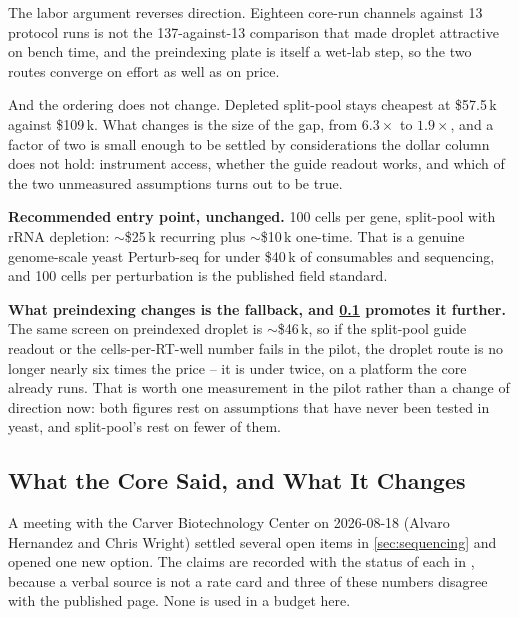 The labor argument reverses direction. Eighteen core-run channels against 13
protocol runs is not the 137-against-13 comparison that made droplet attractive
on bench time, and the preindexing plate is itself a wet-lab step, so the two
routes converge on effort as well as on price.

And the ordering does not change. Depleted split-pool stays cheapest at \$57.5\,k
against \$109\,k. What changes is the size of the gap, from $6.3\times$ to
$1.9\times$, and a factor of two is small enough to be settled by considerations
the dollar column does not hold: instrument access, whether the guide readout
works, and which of the two unmeasured assumptions turns out to be true.

\begin{keybox}
\textbf{Recommended entry point, unchanged.} 100 cells per gene, split-pool with
rRNA depletion: $\sim$\$25\,k recurring plus $\sim$\$10\,k one-time. That is a
genuine genome-scale yeast Perturb-seq for under \$40\,k of consumables and
sequencing, and 100 cells per perturbation is the published field standard.

\textbf{What preindexing changes is the fallback, and \cref{sec:core-meeting} promotes it further.} The same screen
on preindexed droplet is $\sim$\$46\,k, so if the split-pool guide readout or the
cells-per-RT-well number fails in the pilot, the droplet route is no longer
nearly six times the price -- it is under twice, on a platform the core already
runs. That
is worth one measurement in the pilot rather than a change of direction now:
both figures rest on assumptions that have never been tested in yeast, and
split-pool's rest on fewer of them.
\end{keybox}

\subsection{What the Core Said, and What It Changes}
\label{sec:core-meeting}


A meeting with the Carver Biotechnology Center on 2026-08-18 (Alvaro Hernandez
and Chris Wright) settled several open items in \cref{sec:sequencing} and opened
one new option. The claims are recorded with the status of each in
, because a verbal source is not a rate card and three of
these numbers disagree with the published page. None is used in a budget here.

